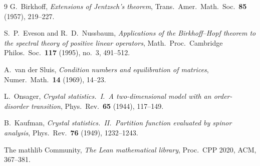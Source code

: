 \documentclass[11pt,a4paper]{article}
\theoremstyle{plain}
\theoremstyle{definition}
\begin{document}
\begin{thebibliography}{9}
 G.~Birkhoff,
  \emph{Extensions of Jentzsch's theorem},
  Trans.\ Amer.\ Math.\ Soc.\ \textbf{85} (1957), 219--227.

 S.~P.~Eveson and R.~D.~Nussbaum,
  \emph{Applications of the Birkhoff--Hopf theorem to the spectral theory of
  positive linear operators}, Math.\ Proc.\ Cambridge Philos.\ Soc.\
  \textbf{117} (1995), no.~3, 491--512.

 A.~van der Sluis,
  \emph{Condition numbers and equilibration of matrices},
  Numer.\ Math.\ \textbf{14} (1969), 14--23.

 L.~Onsager,
  \emph{Crystal statistics.\ I.\ A two-dimensional model with an
  order-disorder transition}, Phys.\ Rev.\ \textbf{65} (1944), 117--149.

 B.~Kaufman,
  \emph{Crystal statistics.\ II.\ Partition function evaluated by spinor
  analysis}, Phys.\ Rev.\ \textbf{76} (1949), 1232--1243.

 The mathlib Community,
  \emph{The Lean mathematical library}, Proc.\ CPP 2020, ACM, 367--381.
\end{thebibliography}
\end{document}
